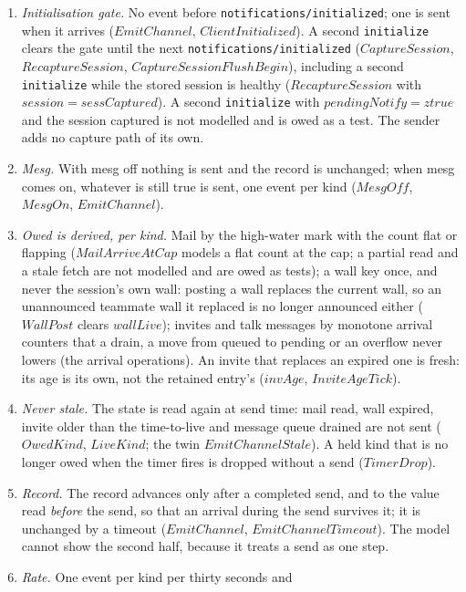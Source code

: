 \documentclass[a4paper,10pt,fleqn]{article}
\begin{document}
\begin{enumerate}
  \item \emph{Initialisation gate.}  No event before
    \texttt{notifications/initialized}; one is sent when it arrives
    ($EmitChannel$, $ClientInitialized$).  A second \texttt{initialize}
    clears the gate until the next \texttt{notifications/initialized}
    ($CaptureSession$, $RecaptureSession$, $CaptureSessionFlushBegin$),
    including a second \texttt{initialize} while the stored session is
    healthy ($RecaptureSession$ with $session = sessCaptured$).  A second
    \texttt{initialize} with $pendingNotify = ztrue$ and the session
    captured is not modelled and is owed as a test.  The sender adds no
    capture path of its own.
  \item \emph{Mesg.}  With mesg off nothing is sent and the record is
    unchanged; when mesg comes on, whatever is still true is sent, one event
    per kind ($MesgOff$, $MesgOn$, $EmitChannel$).
  \item \emph{Owed is derived, per kind.}  Mail by the high-water mark with
    the count flat or flapping ($MailArriveAtCap$ models a flat count at the
    cap; a partial read and a stale fetch are not modelled and are owed as
    tests); a wall key once, and never the session's own wall: posting a wall
    replaces the current wall, so an unannounced teammate wall it replaced
    is no longer announced either ($WallPost$ clears $wallLive$);
    invites and talk messages by monotone arrival counters that a drain, a
    move from queued to pending or an overflow never lowers (the arrival
    operations).  An invite that replaces an expired one is fresh: its age is
    its own, not the retained entry's ($invAge$, $InviteAgeTick$).
  \item \emph{Never stale.}  The state is read again at send time: mail
    read, wall expired, invite older than the time-to-live and message queue
    drained are not sent ($OwedKind$, $LiveKind$; the twin
    $EmitChannelStale$).  A held kind that is no longer owed when the timer
    fires is dropped without a send ($TimerDrop$).
  \item \emph{Record.}  The record advances only after a completed send, and
    to the value read \emph{before} the send, so that an arrival during the
    send survives it; it is unchanged by a timeout ($EmitChannel$,
    $EmitChannelTimeout$).  The model cannot show the second half, because it
    treats a send as one step.
  \item \emph{Rate.}  One event per kind per thirty seconds and

\end{enumerate}
\end{document}
